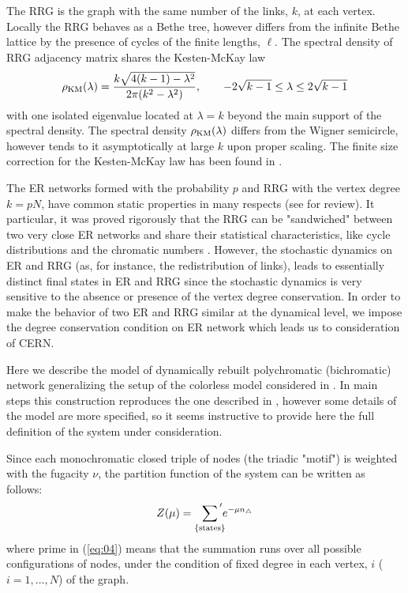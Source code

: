 \documentclass[aps,12pt]{revtex4}
\newcommand{\eq}[1]{(\ref{#1})}
\newcommand{\be}{\begin{equation}}
\newcommand{\ee}{\end{equation}}
\begin{document}
The RRG is the graph with the same number of the links, $k$, at each vertex. Locally the RRG behaves as a Bethe tree, however differs from the infinite Bethe lattice by the presence of cycles of the finite lengths, $\ell$. The spectral density of RRG adjacency matrix shares the Kesten-McKay law \cite{kesten,mckay}
\be
\rho_{\rm KM}(\lambda)= \frac{k\sqrt{4(k-1) - \lambda^2}}{2\pi (k^2 - \lambda^2)}, \qquad
-2\sqrt{k-1}\leq \lambda \leq 2\sqrt{k-1}
\ee
with one isolated eigenvalue located at $\lambda=k$ beyond the main support of the spectral density. The spectral density $\rho_{\rm KM}(\lambda)$ differs from the Wigner semicircle, however tends to it asymptotically at large $k$ upon proper scaling. The finite size correction for the Kesten-McKay law has been found in \cite{parisi}.

The ER networks formed with the probability $p$ and RRG with the vertex degree $k=pN$, have common static properties in many respects
\cite{cycles,spacing} (see \cite{wormald} for review). It particular, it was proved rigorously that the RRG can be "sandwiched" between two very close ER networks and share their statistical characteristics, like cycle distributions and the chromatic numbers \cite{huang}. However, the stochastic dynamics on ER and RRG (as, for instance, the redistribution of links), leads to essentially distinct final states in ER and RRG since the stochastic dynamics is very sensitive to the absence or presence of the vertex degree conservation. In order to make the behavior of two ER and RRG similar at the dynamical level, we impose the degree conservation condition on ER network which leads us to consideration of CERN.

Here we describe the model of dynamically rebuilt polychromatic (bichromatic) network generalizing the setup of the colorless model considered in \cite{decay}. In main steps this construction reproduces the one described in \cite{color}, however some details of the model are more specified, so it seems instructive to provide here the full definition of the system under consideration.

Since each monochromatic closed triple of nodes (the triadic "motif") is weighted with the fugacity $\nu$, the partition function of the system can be written as follows:
\be
Z(\mu) = \sum_{\{\rm states\}} \hspace{-0.25cm} {\vphantom{\sum}}' e^{-\mu n_{\triangle}}
\label{eq:04}
\ee
where prime in \eq{eq:04} means that the summation runs over all possible configurations of nodes, under the condition of fixed degree in each vertex, $i$ ($i=1,..., N$) of the graph.
\end{document}
